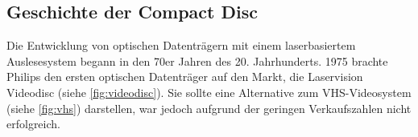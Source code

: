 \subsection{Geschichte der Compact Disc}
\label{subsec:cdgeschichte}

Die Entwicklung von optischen Datenträgern mit einem laserbasiertem
Auslesesystem begann in den 70er Jahren des 20. Jahrhunderts. 1975 brachte
Philips den ersten optischen Datenträger auf den Markt, die Laservision
Videodisc (siehe \autoref{fig:videodisc}). Sie sollte eine Alternative zum
VHS-Videosystem (siehe \autoref{fig:vhs}) darstellen, war jedoch aufgrund der
geringen Verkaufszahlen nicht erfolgreich.

